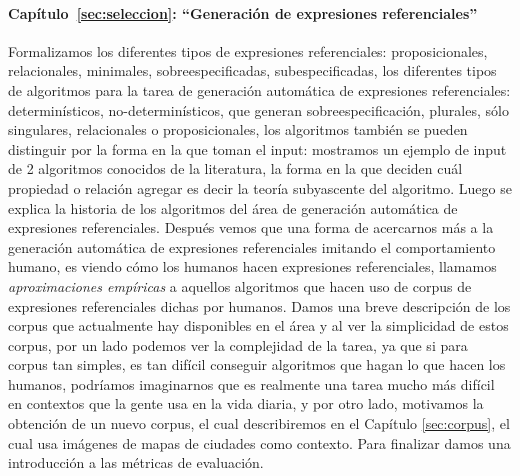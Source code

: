 \paragraph{Cap\'itulo~\ref{sec:seleccion}: ``Generaci\'on de expresiones referenciales''} Formalizamos los diferentes tipos de expresiones referenciales: 
proposicionales, relacionales, minimales, sobreespecificadas, subespecificadas, los diferentes tipos de algoritmos para la tarea de 
generaci\'on autom\'atica de expresiones referenciales: determin\'isticos, no-determin\'isticos, que generan sobreespecificaci\'on, 
plurales, s\'olo singulares, relacionales o proposicionales, los algoritmos tambi\'en se pueden distinguir por la forma en la que toman el 
input: mostramos un ejemplo de input de 2 algoritmos conocidos de la literatura, la forma en la que deciden cu\'al propiedad o relaci\'on 
agregar es decir la teor\'ia subyascente del algoritmo. Luego se explica la historia de los algoritmos del \'area de generaci\'on autom\'atica
 de expresiones referenciales. Despu\'es vemos que una forma de acercarnos m\'as a la generaci\'on autom\'atica de expresiones referenciales
 imitando el comportamiento humano, es viendo c\'omo los humanos hacen expresiones referenciales, llamamos {\it aproximaciones emp\'iricas} 
a aquellos algoritmos que hacen uso de corpus de expresiones referenciales dichas por humanos. Damos una breve descripci\'on de los corpus 
que actualmente hay disponibles en el \'area y al ver la simplicidad de estos corpus, por un lado podemos ver la complejidad de la tarea, 
ya que si para corpus tan simples, es tan dif\'icil conseguir algoritmos que hagan lo que hacen los humanos, podr\'iamos imaginarnos que es 
realmente una tarea mucho m\'as dif\'icil en contextos que la gente usa en la vida diaria, y por otro lado, motivamos la obtenci\'on de un nuevo  corpus, el cual describiremos en el Cap\'itulo \ref{sec:corpus}, el cual usa im\'agenes de mapas de ciudades como contexto. Para finalizar damos una introducci\'on a las m\'etricas de evaluaci\'on. 


